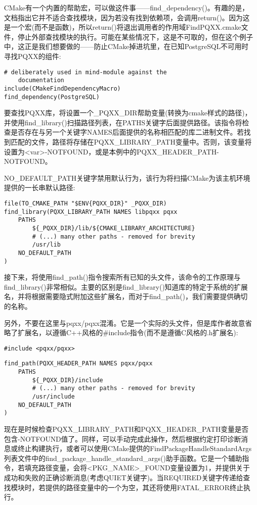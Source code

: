 CMake有一个内置的帮助宏，可以做这件事——find\_dependency()。有趣的是，文档指出它并不适合查找模块，因为若没有找到依赖项，会调用return()。因为这是一个宏(而不是函数)，所以return()将退出调用者的作用域FindPQXX.cmake文件，停止外部查找模块的执行。可能在某些情况下，这是不可取的，但在这个例子中，这正是我们想要做的——防止CMake掉进坑里，在已知PostgreSQL不可用时寻找PQXX的组件:

\begin{lstlisting}[style=styleCMake]
# deliberately used in mind-module against the
	documentation
include(CMakeFindDependencyMacro)
find_dependency(PostgreSQL)
\end{lstlisting}

要查找PQXX库，将设置一个\_PQXX\_DIR帮助变量(转换为cmake样式的路径)，并使用find\_library()扫描路径列表，在PATHS关键字后面提供路径。该指令将检查是否存在与另一个关键字NAMES后面提供的名称相匹配的库二进制文件。若找到匹配的文件，路径将存储在PQXX\_LIBRARY\_PATH变量中。否则，该变量将设置为<var>-NOTFOUND，或是本例中的PQXX\_HEADER\_PATH-NOTFOUND。

NO\_DEFAULT\_PATH关键字禁用默认行为，该行为将扫描CMake为该主机环境提供的一长串默认路径:

\begin{lstlisting}[style=styleCMake]
file(TO_CMAKE_PATH "$ENV{PQXX_DIR}" _PQXX_DIR)
find_library(PQXX_LIBRARY_PATH NAMES libpqxx pqxx
	PATHS
		${_PQXX_DIR}/lib/${CMAKE_LIBRARY_ARCHITECTURE}
		# (...) many other paths - removed for brevity
		/usr/lib
	NO_DEFAULT_PATH
)
\end{lstlisting}

接下来，将使用find\_path()指令搜索所有已知的头文件，该命令的工作原理与find\_library()非常相似。主要的区别是find\_library()知道库的特定于系统的扩展名，并将根据需要隐式附加这些扩展名，而对于find\_path()，我们需要提供确切的名称。

另外，不要在这里与pqxx/pqxx混淆。它是一个实际的头文件，但是库作者故意省略了扩展名，以遵循C++风格的\#include指令(而不是遵循C风格的.h扩展名):

\begin{lstlisting}[style=styleCXX]
#include <pqxx/pqxx>
\end{lstlisting}

\begin{lstlisting}[style=styleCMake]
find_path(PQXX_HEADER_PATH NAMES pqxx/pqxx
	PATHS
		${_PQXX_DIR}/include
		# (...) many other paths - removed for brevity
		/usr/include
	NO_DEFAULT_PATH
)
\end{lstlisting}

现在是时候检查PQXX\_LIBRARY\_PATH和PQXX\_HEADER\_PATH变量是否包含-NOTFOUND值了。同样，可以手动完成此操作，然后根据约定打印诊断消息或终止构建执行，或者可以使用CMake提供的FindPackageHandleStandardArgs列表文件中的find\_package\_handle\_standard\_args()助手函数。它是一个辅助指令，若填充路径变量，会将<PKG\_NAME>\_FOUND变量设置为1，并提供关于成功和失败的正确诊断消息(考虑QUIET关键字)。当REQUIRED关键字传递给查找模块时，若提供的路径变量中的一个为空，其还将使用FATAL\_ERROR终止执行。


